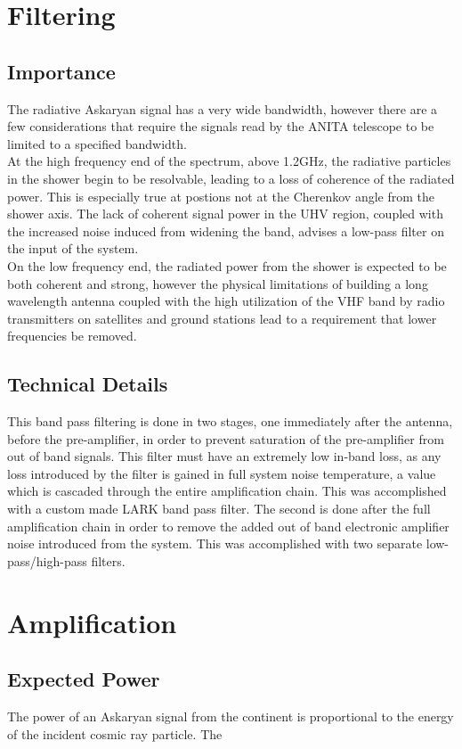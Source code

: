 \section{Filtering}
	\subsection{Importance}
		The radiative Askaryan signal has a very wide bandwidth, however there are a few considerations that require the signals read by the ANITA telescope to be limited to a specified bandwidth.  \\
		At the high frequency end of the spectrum, above 1.2GHz, the radiative particles in the shower begin to be resolvable, leading to a loss of coherence of the radiated power.  This is especially true at postions not at the Cherenkov angle from the shower axis.  The lack of coherent signal power in the UHV region, coupled with the increased noise induced from widening the band, advises a low-pass filter on the input of the system. \\
		On the low frequency end, the radiated power from the shower is expected to be both coherent and strong, however the physical limitations of building a long wavelength antenna coupled with the high utilization of the VHF band by radio transmitters on satellites and ground stations lead to a requirement that lower frequencies be removed. \\
	\subsection{Technical Details}
		This band pass filtering is done in two stages, one immediately after the antenna, before the pre-amplifier, in order to prevent saturation of the pre-amplifier from out of band signals.  This filter must have an extremely low in-band loss, as any loss introduced by the filter is gained in full system noise temperature, a value which is cascaded through the entire amplification chain.  This was accomplished with a custom made LARK band pass filter.  The second is done after the full amplification chain in order to remove the added out of band electronic amplifier noise introduced from the system.  This was accomplished with two separate low-pass/high-pass filters.
		
		
\section{Amplification}
	\subsection{Expected Power}
		The power of an Askaryan signal from the continent is proportional to the energy of the incident cosmic ray particle.  The 
